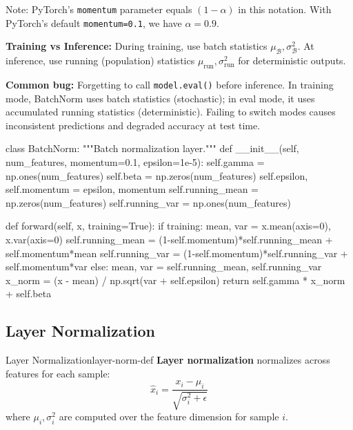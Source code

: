 \documentclass[../../main.tex]{subfiles}
\begin{document}
Note: PyTorch's \texttt{momentum} parameter equals $(1-\alpha)$ in this notation. With PyTorch's default \texttt{momentum=0.1}, we have $\alpha=0.9$.

\begin{important}
\textbf{Training vs Inference:} During training, use batch statistics $\mu_\mathcal{B}, \sigma^2_\mathcal{B}$. At inference, use running (population) statistics $\mu_{\text{run}}, \sigma^2_{\text{run}}$ for deterministic outputs.

\textbf{Common bug:} Forgetting to call \texttt{model.eval()} before inference. In training mode, BatchNorm uses batch statistics (stochastic); in eval mode, it uses accumulated running statistics (deterministic). Failing to switch modes causes inconsistent predictions and degraded accuracy at test time.
\end{important}

\begin{pythoncode}
class BatchNorm:
    """Batch normalization layer."""
    def __init__(self, num_features, momentum=0.1, epsilon=1e-5):
        self.gamma = np.ones(num_features)
        self.beta = np.zeros(num_features)
        self.epsilon, self.momentum = epsilon, momentum
        self.running_mean = np.zeros(num_features)
        self.running_var = np.ones(num_features)

    def forward(self, x, training=True):
        if training:
            mean, var = x.mean(axis=0), x.var(axis=0)
            self.running_mean = (1-self.momentum)*self.running_mean + self.momentum*mean
            self.running_var = (1-self.momentum)*self.running_var + self.momentum*var
        else:
            mean, var = self.running_mean, self.running_var
        x_norm = (x - mean) / np.sqrt(var + self.epsilon)
        return self.gamma * x_norm + self.beta
\end{pythoncode}

\subsection{Layer Normalization}
\label{sec:layer-norm}

\begin{definition}{Layer Normalization}{layer-norm-def}
\textbf{Layer normalization} normalizes across features for each sample:
\[
    \hat{x}_i = \frac{x_i - \mu_i}{\sqrt{\sigma_i^2 + \epsilon}}
\]
where $\mu_i, \sigma_i^2$ are computed over the feature dimension for sample $i$.
\end{definition}
\end{document}
